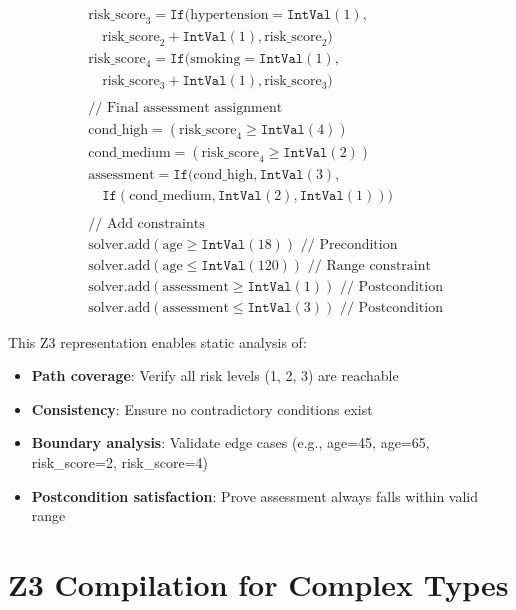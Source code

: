 \begin{align*}
& \text{risk\_score}_3 = \texttt{If}(\text{hypertension} = \texttt{IntVal}(1), \\
& \quad \text{risk\_score}_2 + \texttt{IntVal}(1), \text{risk\_score}_2) \\
& \text{risk\_score}_4 = \texttt{If}(\text{smoking} = \texttt{IntVal}(1), \\
& \quad \text{risk\_score}_3 + \texttt{IntVal}(1), \text{risk\_score}_3) \\
\\
& \text{// Final assessment assignment} \\
& \text{cond\_high} = (\text{risk\_score}_4 \geq \texttt{IntVal}(4)) \\
& \text{cond\_medium} = (\text{risk\_score}_4 \geq \texttt{IntVal}(2)) \\
& \text{assessment} = \texttt{If}(\text{cond\_high}, \texttt{IntVal}(3), \\
& \quad \texttt{If}(\text{cond\_medium}, \texttt{IntVal}(2), \texttt{IntVal}(1))) \\
\\
& \text{// Add constraints} \\
& \text{solver.add}(\text{age} \geq \texttt{IntVal}(18))  \text{ // Precondition} \\
& \text{solver.add}(\text{age} \leq \texttt{IntVal}(120))  \text{ // Range constraint} \\
& \text{solver.add}(\text{assessment} \geq \texttt{IntVal}(1))  \text{ // Postcondition} \\
& \text{solver.add}(\text{assessment} \leq \texttt{IntVal}(3))  \text{ // Postcondition}
\end{align*}

This Z3 representation enables static analysis of:
\begin{itemize}
    \item \textbf{Path coverage}: Verify all risk levels (1, 2, 3) are reachable
    \item \textbf{Consistency}: Ensure no contradictory conditions exist
    \item \textbf{Boundary analysis}: Validate edge cases (e.g., age=45, age=65, risk\_score=2, risk\_score=4)
    \item \textbf{Postcondition satisfaction}: Prove assessment always falls within valid range
\end{itemize}

\section{Z3 Compilation for Complex Types}
\label{sec:z3-complex-types}

